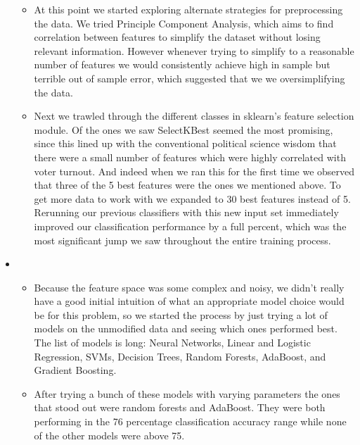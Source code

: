 \begin{itemize}
\begin{itemize}
    \item At this point we started exploring alternate strategies for preprocessing the data. We tried Principle Component
    Analysis, which aims to find correlation between features to simplify the dataset without losing relevant information. However whenever trying to simplify to a reasonable number of features we would consistently achieve high in sample but
    terrible out of sample error, which suggested that we we oversimplifying the data.

    \item Next we trawled through the different classes in sklearn's feature selection module. Of the ones we saw SelectKBest
    seemed the most promising, since this lined up with the conventional political science wisdom that there were a small number
    of features which were highly correlated with voter turnout. And indeed when we ran this for the first time we observed
    that three of the 5 best features were the ones we mentioned above. To get more data to work with we expanded to 30 best
    features instead of 5. Rerunning our previous classifiers with this new input set immediately improved our classification
    performance by a full percent, which was the most significant jump we saw throughout the entire training process.

    \end{itemize}

    \item {}
    \begin{itemize}

    \item Because the feature space was some complex and noisy, we didn't really have a good initial intuition of what an appropriate model choice would be for this problem, so we started the process by just trying a lot of models on the unmodified data and seeing which ones performed best. The list of models is long: Neural Networks, Linear and Logistic Regression, SVMs, Decision Trees, Random Forests, AdaBoost, and Gradient Boosting.

    \item After trying a bunch of these models with varying parameters the ones that stood out were random forests and AdaBoost. They were both performing in the 76 percentage classification accuracy range while none of the other models were above 75. 


    \end{itemize}

\end{itemize}



